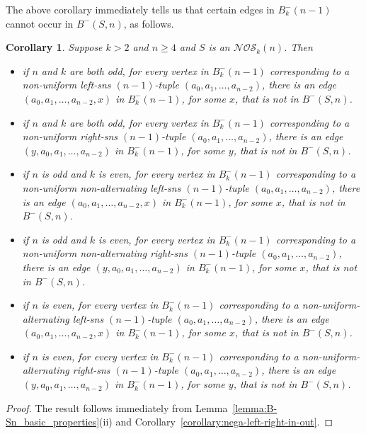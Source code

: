 \documentclass[a4paper,11pt]{article}
\theoremstyle{plain}
\newtheorem{corollary}[lemma]{Corollary}
\theoremstyle{definition}
\theoremstyle{remark}
\begin{document}
The above corollary immediately tells us that certain edges in $B^-_k(n-1)$ cannot occur in
$B^-(S,n)$, as follows.

\begin{corollary}  \label{corollary:NOS_excluded_tuples_by_unequal_degree}
Suppose $k>2$ and $n\geq4$ and $S$ is an $\mathcal{NOS}_k(n)$. Then
\begin{itemize}
\item[i)] if $n$ and $k$ are both odd, for every vertex in $B^-_k(n-1)$ corresponding to a
    non-uniform left-sns $(n-1)$-tuple $(a_0,a_1,\ldots,a_{n-2})$, there is an edge
    $(a_0,a_1,\ldots,a_{n-2},x)$ in $B^-_k(n-1)$, for some $x$, that is not in $B^-(S,n)$.
\item[ii)] if $n$ and $k$ are both odd, for every vertex in $B^-_k(n-1)$ corresponding to a
    non-uniform right-sns $(n-1)$-tuple $(a_0,a_1,\ldots,a_{n-2})$, there is an edge
    $(y,a_0,a_1,\ldots,a_{n-2})$ in $B^-_k(n-1)$, for some $y$, that is not in $B^-(S,n)$.
\item[iii)] if $n$ is odd and $k$ is even, for every vertex in $B^-_k(n-1)$ corresponding to a
    non-uniform non-alternating left-sns $(n-1)$-tuple $(a_0,a_1,\ldots,a_{n-2})$, there is an
    edge $(a_0,a_1,\ldots,a_{n-2},x)$ in $B^-_k(n-1)$, for some $x$, that is not in $B^-(S,n)$.
\item[iv)] if $n$ is odd and $k$ is even, for every vertex in $B^-_k(n-1)$ corresponding to a
    non-uniform non-alternating right-sns $(n-1)$-tuple $(a_0,a_1,\ldots,a_{n-2})$, there is an
    edge $(y,a_0,a_1,\ldots,a_{n-2})$ in $B^-_k(n-1)$, for some $x$, that is not in $B^-(S,n)$.
\item[v)] if $n$ is even, for every vertex in $B^-_k(n-1)$ corresponding to a
    non-uniform-alternating left-sns $(n-1)$-tuple $(a_0,a_1,\ldots,a_{n-2})$, there is an edge
    $(a_0,a_1,\ldots,a_{n-2},x)$ in $B^-_k(n-1)$, for some $x$, that is not in $B^-(S,n)$.
\item[vi)] if $n$ is even, for every vertex in $B^-_k(n-1)$ corresponding to a
    non-uniform-alternating right-sns $(n-1)$-tuple $(a_0,a_1,\ldots,a_{n-2})$, there is an
    edge $(y,a_0,a_1,\ldots,a_{n-2})$ in $B^-_k(n-1)$, for some $y$, that is not in $B^-(S,n)$.
\end{itemize}
\end{corollary}

\begin{proof}
The result follows immediately from Lemma~\ref{lemma:B-Sn_basic_properties}(ii) and
Corollary~\ref{corollary:nega-left-right-in-out}.
\end{proof}
\end{document}
